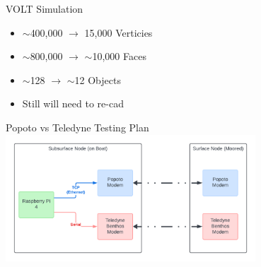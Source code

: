 

\begin{frame}{VOLT Simulation}
    \begin{itemize}
        \item $\sim$400,000 $\rightarrow$ 15,000 Verticies
        \item $\sim$800,000 $\rightarrow$ $\sim$10,000 Faces
        \item $\sim$128 $\rightarrow$ $\sim$12 Objects
        \item Still will need to re-cad 
    \end{itemize}    
\end{frame}

\begin{frame}{Popoto vs Teledyne Testing Plan}
    \centering
    \includegraphics[height=0.7\textheight,width=0.7\textwidth,keepaspectratio]{images/VOLT/VOLT-TestingPlan.png}
\end{frame}






